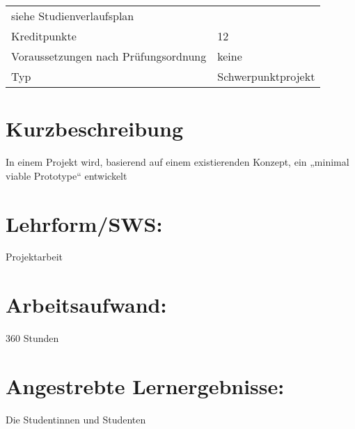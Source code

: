 \begin{longtable}[]{@{}ll@{}}
\begin{minipage}[t]{0.12\columnwidth}
siehe Studienverlaufsplan\strut
\end{minipage}\tabularnewline
\begin{minipage}[t]{0.12\columnwidth}\raggedright\strut
Kreditpunkte\strut
\end{minipage} & \begin{minipage}[t]{0.12\columnwidth}\raggedright\strut
12\strut
\end{minipage}\tabularnewline
\begin{minipage}[t]{0.12\columnwidth}\raggedright\strut
Voraussetzungen nach Prüfungsordnung\strut
\end{minipage} & \begin{minipage}[t]{0.12\columnwidth}\raggedright\strut
keine\strut
\end{minipage}\tabularnewline
\begin{minipage}[t]{0.12\columnwidth}\raggedright\strut
Typ\strut
\end{minipage} & \begin{minipage}[t]{0.12\columnwidth}\raggedright\strut
Schwerpunktprojekt\strut
\end{minipage}\tabularnewline
\bottomrule
\end{longtable}

\section*{Kurzbeschreibung}\label{kurzbeschreibung-8}

In einem Projekt wird, basierend auf einem existierenden Konzept, ein
„minimal viable Prototype`` entwickelt

\section*{Lehrform/SWS:}\label{lehrformsws-14}

Projektarbeit

\section*{Arbeitsaufwand:}\label{arbeitsaufwand-14}

360 Stunden

\section*{Angestrebte
Lernergebnisse:}\label{angestrebte-lernergebnisse-14}

Die Studentinnen und Studenten

